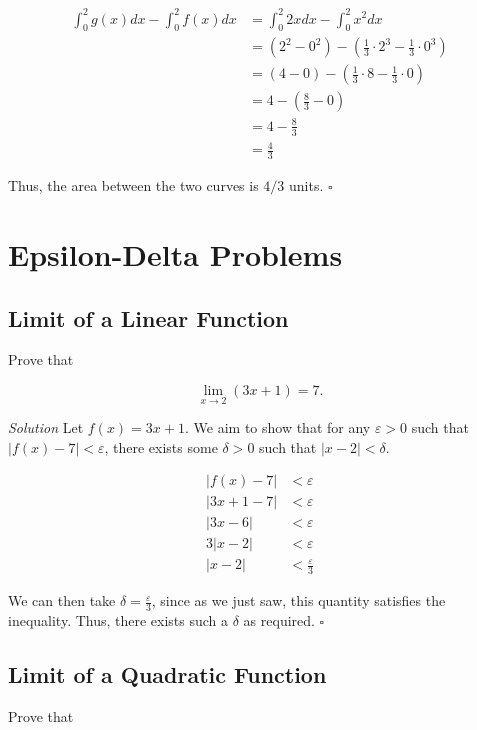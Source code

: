 \documentclass{article}
\begin{document}
\[
  \begin{split}
    \int_{0}^{2} g(x) dx - \int_{0}^{2} f(x) dx
    & = \int_{0}^{2} 2x dx - \int_{0}^{2} x^2 dx \\
    & = (2^2 - 0^2) - (\frac{1}{3} \cdot 2^3 - \frac{1}{3} \cdot 0^3) \\
    & = (4 - 0) - (\frac{1}{3} \cdot 8 - \frac{1}{3} \cdot 0) \\
    & = 4 - (\frac{8}{3} - 0) \\
    & = 4 - \frac{8}{3} \\
    & = \frac{4}{3}
  \end{split}
\]

Thus, the area between the two curves is \(4/3\) units. \(\square\)

\section{Epsilon-Delta Problems}

\subsection{Limit of a Linear Function}

Prove that

\[
  \lim_{x \rightarrow 2} (3x + 1) = 7.
\]

\textit{Solution} \: Let \(f(x) = 3x + 1\). We aim to show that for any
\(\varepsilon > 0\) such that \(|f(x) - 7| < \varepsilon\), there exists some
\(\delta > 0\) such that \(|x - 2| < \delta\).

\[
  \begin{split}
    |f(x) - 7| & < \varepsilon \\
    |3x + 1 - 7| & < \varepsilon \\
    |3x - 6| & < \varepsilon \\
    3|x - 2| & < \varepsilon \\
    |x - 2| & < \frac{\varepsilon}{3}
  \end{split}
\]

We can then take \(\delta = \frac{\varepsilon}{3}\), since as we just saw, this
quantity satisfies the inequality. Thus, there exists such a \(\delta\) as
required. \(\square\)

\subsection{Limit of a Quadratic Function}

Prove that
\end{document}

